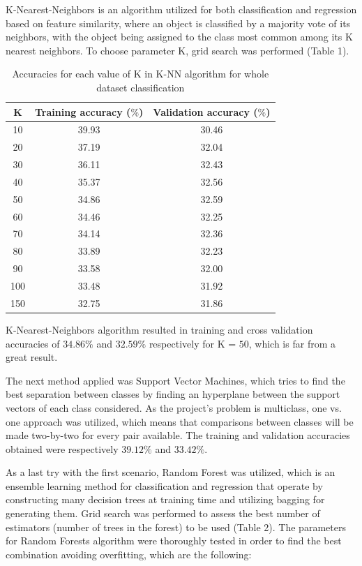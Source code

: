 \documentclass[10pt,twocolumn,letterpaper]{article}
\begin{document}
K-Nearest-Neighbors is an algorithm utilized for both classification and regression based on feature similarity, where an object is classified by a majority vote of its neighbors, with the object being assigned to the class most common among its K nearest neighbors. To choose parameter K, grid search was performed (Table 1).

\begin{table}[h!]
  \begin{center}
    \label{tab:knn_table_whole}
    \begin{tabular}{c|c|c} %
      \textbf{K} & \textbf{Training accuracy ($\%$)} & \textbf{Validation accuracy ($\%$)}\\
      \hline
      10 & 39.93 & 30.46\\
      20 & 37.19 & 32.04\\
      30 & 36.11 & 32.43\\
      40 & 35.37 & 32.56\\
      50 & 34.86 & 32.59\\
      60 & 34.46 & 32.25\\
      70 & 34.14 & 32.36\\
      80 & 33.89 & 32.23\\
      90 & 33.58 & 32.00\\
      100 & 33.48 & 31.92\\
      150 & 32.75 & 31.86\\
    \end{tabular}
    \caption{Accuracies for each value of K in K-NN algorithm for whole dataset classification}
  \end{center}
\end{table}

K-Nearest-Neighbors algorithm resulted in training and cross validation accuracies of $34.86\%$  and $32.59\%$ respectively for K = $50$, which is far from a great result.

The next method applied was Support Vector Machines, which tries to find the best separation between classes by finding an hyperplane between the support vectors of each class considered. As the project's problem is multiclass, one vs. one approach was utilized, which means that comparisons between classes will be made two-by-two for every pair available. The training and validation accuracies obtained were respectively $39.12\%$ and $33.42\%$.

As a last try with the first scenario, Random Forest was utilized, which is an ensemble learning method for classification and regression that operate by constructing many decision trees at training time and utilizing bagging for generating them. Grid search was performed to assess the best number of estimators (number of trees in the forest) to be used (Table 2). The parameters for Random Forests algorithm were thoroughly tested in order to find the best combination avoiding overfitting, which are the following:
\end{document}

